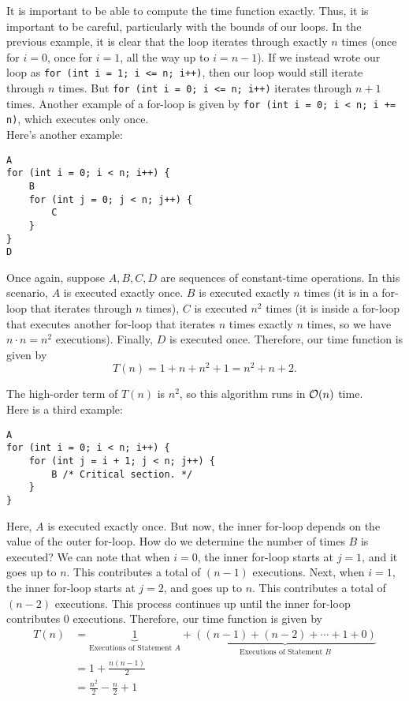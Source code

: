 It is important to be able to compute the time function exactly. Thus, it is important to be careful, particularly with the bounds of our loops. In the previous example, it is clear that the loop iterates through exactly $n$ times (once for $i = 0$, once for $i = 1$, all the way up to $i = n - 1$). If we instead wrote our loop as \verb!for (int i = 1; i <= n; i++)!, then our loop would still iterate through $n$ times. But \verb!for (int i = 0; i <= n; i++)! iterates through $n + 1$ times. Another example of a for-loop is given by \verb!for (int i = 0; i < n; i += n)!, which executes only once. \\


Here's another example:

\begin{lstlisting}
A
for (int i = 0; i < n; i++) {
    B
    for (int j = 0; j < n; j++) {
        C
    }
}
D
\end{lstlisting}

Once again, suppose $A, B, C, D$ are sequences of constant-time operations. In this scenario, $A$ is executed exactly once. $B$ is executed exactly $n$ times (it is in a for-loop that iterates through $n$ times), $C$ is executed $n^{2}$ times (it is inside a for-loop that executes another for-loop that iterates $n$ times exactly $n$ times, so we have $n \cdot n = n^{2}$ executions).  Finally, $D$ is executed once. Therefore, our time function is given by
\[
T(n) = 1 + n + n^{2} + 1 = n^{2} + n + 2.
\]

The high-order term of $T(n)$ is $n^{2}$, so this algorithm runs in $\mathcal{O}(n)$ time.  \\

Here is a third example:

\begin{lstlisting}
A
for (int i = 0; i < n; i++) {
    for (int j = i + 1; j < n; j++) {
        B /* Critical section. */
    }
}
\end{lstlisting}

Here, $A$ is executed exactly once. But now, the inner for-loop depends on the value of the outer for-loop. How do we determine the number of times $B$ is executed? We can note that when $i = 0$, the inner for-loop starts at $j = 1$, and it goes up to $n$. This contributes a total of $(n - 1)$ executions. Next, when $i = 1$, the inner for-loop starts at $j = 2$, and goes up to $n$. This contributes a total of $(n - 2)$ executions. This process continues up until the inner for-loop contributes $0$ executions. Therefore, our time function is given by
\begin{align*}
T(n) &= \underbrace{1}_{\text{Executions of Statement $A$}} + \underbrace{\left((n - 1) + (n - 2) + \cdots + 1 + 0\right)}_{\text{Executions of Statement $B$}} \\[1em]
&= 1 + \frac{n(n - 1)}{2} \\[1em]
&= \frac{n^2}{2} - \frac{n}{2} + 1
\end{align*}

